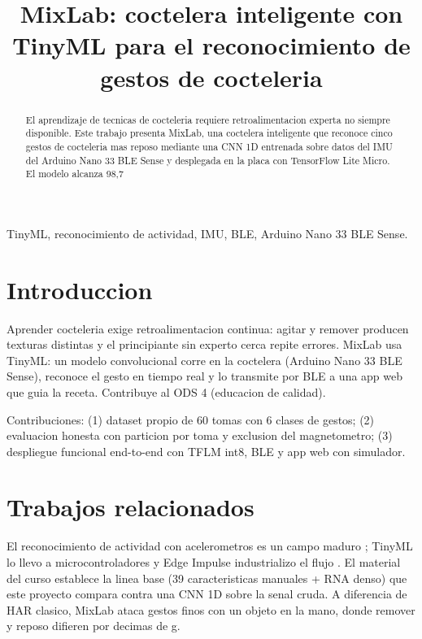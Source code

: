 \documentclass[conference]{IEEEtran}
\title{MixLab: coctelera inteligente con TinyML para el reconocimiento de gestos de cocteleria}
\author{\IEEEauthorblockN{Cesar Armando Reyes Oliveros\\Juan Camilo Diaz Rangel\\Sebastian Santana}
\IEEEauthorblockA{Facultad de Ingenieria\\Universidad Autonoma de Occidente\\Cali, Colombia}}
\begin{document}
\maketitle
\begin{abstract}
El aprendizaje de tecnicas de cocteleria requiere retroalimentacion experta no siempre disponible. Este trabajo presenta MixLab, una coctelera inteligente que reconoce cinco gestos de cocteleria mas reposo mediante una CNN 1D entrenada sobre datos del IMU del Arduino Nano 33 BLE Sense y desplegada en la placa con TensorFlow Lite Micro. El modelo alcanza 98,7%
\end{abstract}
\begin{IEEEkeywords}
TinyML, reconocimiento de actividad, IMU, BLE, Arduino Nano 33 BLE Sense.
\end{IEEEkeywords}
\section{Introduccion}
Aprender cocteleria exige retroalimentacion continua: agitar y remover producen texturas distintas y el principiante sin experto cerca repite errores. MixLab usa TinyML: un modelo convolucional corre en la coctelera (Arduino Nano 33 BLE Sense), reconoce el gesto en tiempo real y lo transmite por BLE a una app web que guia la receta. Contribuye al ODS 4 (educacion de calidad).

Contribuciones: (1) dataset propio de 60 tomas con 6 clases de gestos; (2) evaluacion honesta con particion por toma y exclusion del magnetometro; (3) despliegue funcional end-to-end con TFLM int8, BLE y app web con simulador.

\section{Trabajos relacionados}
El reconocimiento de actividad con acelerometros es un campo maduro \cite{bao, kwapisz}; TinyML lo llevo a microcontroladores \cite{warden} y Edge Impulse industrializo el flujo \cite{ei}. El material del curso \cite{curso} establece la linea base (39 caracteristicas manuales + RNA denso) que este proyecto compara contra una CNN 1D sobre la senal cruda. A diferencia de HAR clasico, MixLab ataca gestos finos con un objeto en la mano, donde remover y reposo difieren por decimas de g.
\end{document}
